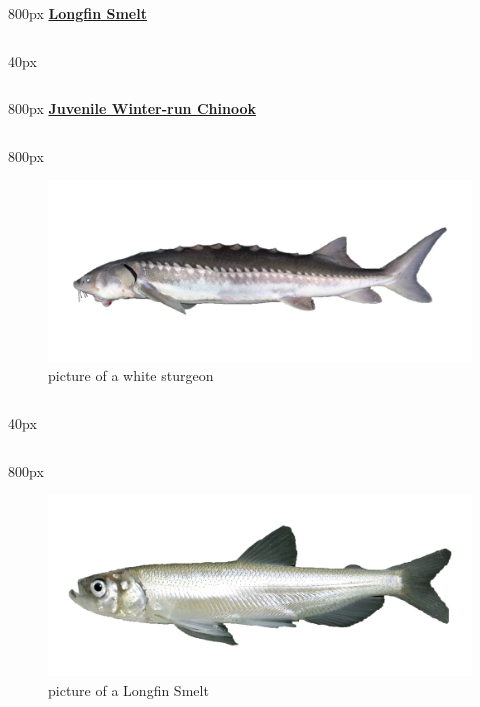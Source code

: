 \documentclass[
]{book}
\begin{document}
\begin{column}{800px\textwidth}
\textbf{\href{http://calfish.ucdavis.edu/species/?uid=87\&ds=698}{Longfin Smelt}}
\end{column}

\begin{column}{40px\textwidth}
~
\end{column}

\begin{column}{800px\textwidth}
\textbf{\href{http://calfish.ucdavis.edu/species/?uid=30\&ds=698}{Juvenile Winter-run Chinook}}
\end{column}

\begin{column}{800px\textwidth}
\begin{figure}

{\centering \includegraphics[width=29.17in]{figures/white_sturgeon_adult} 

}

\caption{picture of a white sturgeon}\label{fig:unnamed-chunk-170}
\end{figure}
\end{column}

\begin{column}{40px\textwidth}
~
\end{column}

\begin{column}{800px\textwidth}
\begin{figure}

{\centering \includegraphics[width=29.17in]{figures/longfin_smelt_adult} 

}

\caption{picture of a Longfin Smelt}\label{fig:unnamed-chunk-171}
\end{figure}
\end{column}
\end{document}
